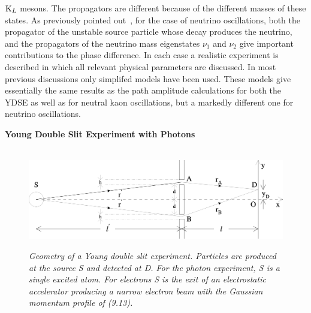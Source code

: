 \documentclass [12pt]{article}
\begin{document}
{   ${\rm K}_L$ mesons. The propagators are different because of the different masses of these states.
   As previously pointed out~\cite{JHF1,JHF2,JHF3}, for the case of neutrino oscillations, 
   both the propagator of the unstable source particle whose decay produces the neutrino, and 
   the propagators of the neutrino mass eigenstates $\nu_1$ and $\nu_2$ give important
  contributions to the phase difference. 
   In each case a realistic experiment is described in which all relevant physical parameters
  are discussed. In most previous discussions only simplifed models have been used. These models give 
   essentially the same results as the path amplitude calculations for both the YDSE 
   as well as for neutral
   kaon oscillations, but a markedly different one for neutrino oscillations.

   \par {\bf \Large Young Double Slit Experiment with Photons}
\begin{figure}[htbp]
\begin{center}
\hspace*{-0.5cm}\mbox{
\includegraphics[width=5.5in]{poptf10c.eps}}
\caption{{\sl Geometry of a Young double slit experiment. Particles are 
  produced at the source S and detected at D. For the photon experiment, S is a 
  single excited atom. For electrons S is the exit of an electrostatic 
  accelerator producing a narrow electron beam with the Gaussian momentum
  profile of (9.13). }} 
\label{fig-fig10}
\end{center}
\end{figure}

}
\end{document}
